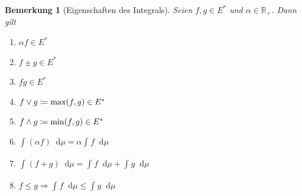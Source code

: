 \documentclass[11pt, twoside, a4paper]{article}
\theoremstyle{plain}
\newtheorem{bemerkung}[blockelement]{Bemerkung}
\numberwithin{equation}{subsection}
\newcommand{\pair}[1]{\left(#1\right)}
\newcommand{\of}[1]{\mathopen{}\mathclose{}\bgroup\left(#1\aftergroup\egroup\right)}
\newcommand{\impl}[0]{\Rightarrow{}}
\newcommand{\dif}{\mathop{}\!\mathrm{d}}
\newcommand{\dsty}{\displaystyle}
\newcommand{\R}{\mathbb{R}}
\begin{document}
    \begin{bemerkung}[Eigenschaften des Integrals]
        \marginnote{[20. Dez]}
        Seien $f, g\in E^{\ast}$ und $\alpha\in\R_+$. Dann gilt
        \begin{enumerate}[label=(\roman*)]
            \item $\alpha f\in E^{\ast}$
            \item $f\pm g \in E^{\ast}$
            \item $fg \in E^{\ast}$
            \item $f \lor g \coloneqq \max\of{f, g}\in E^{\ast}$
            \item $f \land g \coloneqq \min\of{f, g}\in E^{\ast}$
            \item $\dsty \int_{}^{} \pair{\alpha f} \dif \mu = \alpha\int_{}^{} f \dif \mu$
            \item $\dsty \int_{}^{} \pair{f+g} \dif \mu = \int_{}^{} f \dif \mu + \int_{}^{} g \dif \mu$
            \item $f\leq g \impl \dsty \int_{}^{} f \dif \mu \leq \int_{}^{} g \dif \mu$
        \end{enumerate}


\end{bemerkung}
\end{document}
